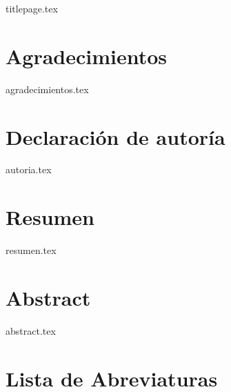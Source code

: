 \documentclass[twoside,openright,11pt]{report}
\begin{document}
\renewcommand{\figurename}{Imagen}
\renewcommand{\listfigurename}{Lista de Imágenes}




\thispagestyle{empty}
{titlepage.tex}

\newpage


\chapter*{Agradecimientos}

{agradecimientos.tex}

\chapter*{Declaración de autoría}


{autoria.tex}



\chapter*{Resumen}

{resumen.tex}


\chapter*{Abstract}

{abstract.tex}


\tableofcontents
\thispagestyle{plain}


\chapter*{Lista de Abreviaturas}
\end{document}
